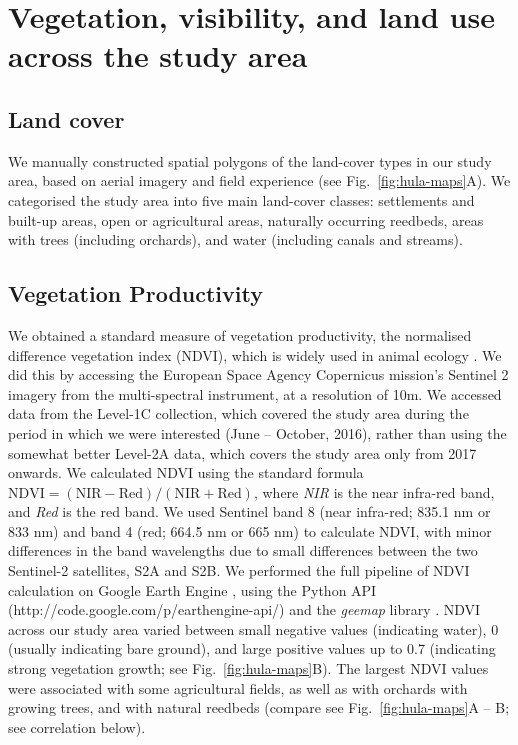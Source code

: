 \section*{Vegetation, visibility, and land use across the study area}

\subsection*{Land cover}

We manually constructed spatial polygons of the land-cover types in our study area, based on aerial imagery and field experience (see Fig.~\ref{fig:hula-maps}A).
We categorised the study area into five main land-cover classes: settlements and built-up areas, open or agricultural areas, naturally occurring reedbeds, areas with trees (including orchards), and water (including canals and streams). 

\subsection*{Vegetation Productivity}

We obtained a standard measure of vegetation productivity, the normalised difference vegetation index (NDVI), which is widely used in animal ecology \parencite{pettorelli2011}.
We did this by accessing the European Space Agency Copernicus mission's Sentinel 2 imagery from the multi-spectral instrument, at a resolution of 10m.
We accessed data from the Level-1C collection, which covered the study area during the period in which we were interested (June -- October, 2016), rather than using the somewhat better Level-2A data, which covers the study area only from 2017 onwards.
We calculated NDVI using the standard formula $\text{NDVI} = (\text{NIR} - \text{Red}) / (\text{NIR} + \text{Red})$, where \textit{NIR} is the near infra-red band, and \textit{Red} is the red band.
We used Sentinel band 8 (near infra-red; 835.1 nm or 833 nm) and band 4 (red; 664.5 nm or 665 nm) to
calculate NDVI, with minor differences in the band wavelengths due to small differences between the two Sentinel-2 satellites, S2A and S2B.
We performed the full pipeline of NDVI calculation on Google Earth Engine \parencite{gorelick2017}, using the Python API (http://code.google.com/p/earthengine-api/) and the \textit{geemap} library \parencite{wu2020}.
NDVI across our study area varied between small negative values (indicating water), 0 (usually indicating bare ground), and large positive values up to 0.7 (indicating strong vegetation growth; see Fig.~\ref{fig:hula-maps}B).
The largest NDVI values were associated with some agricultural fields, as well as with orchards with growing trees, and with natural reedbeds (compare see Fig.~\ref{fig:hula-maps}A -- B; see correlation below).

